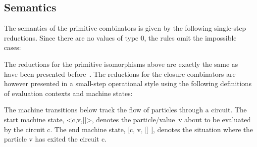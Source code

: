 \documentclass[preprint]{sigplanconf}
\begin{document}
\subsection{Semantics}

The semantics of the primitive combinators is given by the following
single-step reductions. Since there are no values of type {{0}}, the rules
omit the impossible cases:
\begin{scriptsize}
\end{scriptsize}
The reductions for the primitive isomorphisms above are exactly the same as
have been presented before~\cite{infeffects}. The reductions for the closure
combinators are however presented in a small-step operational style using the
following definitions of evaluation contexts and machine states:

\begin{scriptsize}
\end{scriptsize}
The machine transitions below track the flow of particles through a
circuit. The start machine state, {{<c,v,[]>}}, denotes the
particle/value~{{v}} about to be evaluated by the circuit {{c}}. The end
machine state, {{[c, v, [] ]}}, denotes the situation where the particle
{{v}} has exited the circuit {{c}}.
\end{document}
